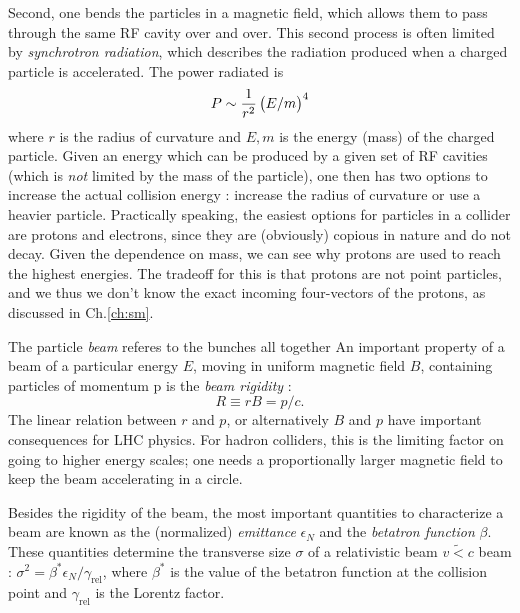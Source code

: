 Second, one bends the particles in a magnetic field, which allows them to pass through the same RF cavity over and over.
This second process is often limited by \textit{synchrotron radiation}, which describes the radiation produced when a charged particle is accelerated.
The power radiated is
\begin{equation}
P \sim \frac{1}{r^2} \begin{pmatrix} E/m \end{pmatrix}^4
\end{equation}
where $r$ is the radius of curvature and $E,m$ is the energy (mass) of the charged particle.
Given an energy which can be produced by a given set of RF cavities (which is \textit{not} limited by the mass of the particle), one then has two options to increase the actual collision energy : increase the radius of curvature or use a heavier particle.
Practically speaking, the easiest options for particles in a collider are protons and electrons, since they are (obviously) copious in nature and do not decay\footnotemark.
Given the dependence on mass, we can see why protons are used to reach the highest energies.
The tradeoff for this is that protons are not point particles, and we thus we don't know the exact incoming four-vectors of the protons, as discussed in Ch.\ref{ch:sm}.

The particle \textit{beam} referes to the bunches all together
An important property of a beam of a particular energy $E$, moving in uniform magnetic field $B$, containing particles of momentum p is the \textit{beam rigidity} :
\begin{equation}\label{eq:rigidity}
R \equiv r B = p / c.
\end{equation}
The linear relation between $r$ and $p$, or alternatively $B$ and $p$ have important consequences for LHC physics.
For hadron colliders, this is the limiting factor on going to higher energy scales; one needs a proportionally larger magnetic field to keep the beam accelerating in a circle.

Besides the rigidity of the beam, the most important quantities to characterize a beam are known as the (normalized) \textit{emittance} $\epsilon_N$ and the \textit{betatron function} $\beta$.
These quantities determine the transverse size $\sigma$ of a relativistic beam $v \widetilde{<} c$ beam : $\sigma^2 = \beta^* \epsilon_N / \gamma_{\text{rel}}$, where $\beta^*$ is the value of the betatron function at the collision point and $\gamma_{\text{rel}}$ is the Lorentz factor.

